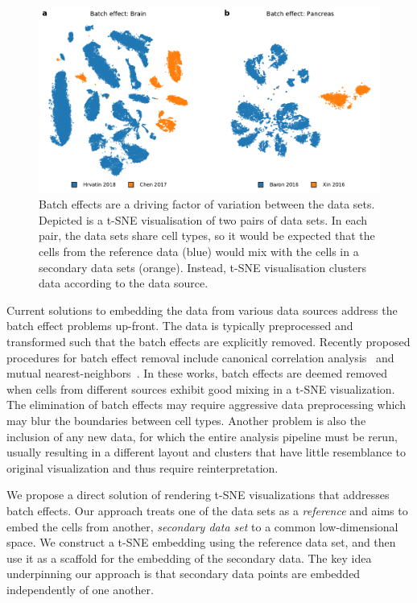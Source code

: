 \documentclass[runningheads]{llncs}
\begin{document}
\begin{figure}[htbp]
  \includegraphics[width=\textwidth]{figures/batch_effect.pdf}
  \caption{Batch effects are a driving factor of variation between the data
  sets.  Depicted is a t-SNE visualisation of two pairs of data sets. In each
  pair, the data sets share cell types, so it would be expected that the cells
  from the reference data (blue) would mix with the cells in a secondary data
  sets (orange).  Instead, t-SNE visualisation clusters data according to the
  data source.}
  \label{fig:batch_effect}
\end{figure}

Current solutions to embedding the data from various data sources address the
batch effect problems up-front. The data is typically preprocessed and
transformed such that the batch effects are explicitly removed. Recently
proposed procedures for batch effect removal include canonical correlation
analysis~\cite{cca} and mutual nearest-neighbors~\cite{mnn,seurat}.  In these
works, batch effects are deemed removed when cells from different sources
exhibit good mixing in a t-SNE visualization.  The elimination of batch effects
may require aggressive data preprocessing which may blur the boundaries between
cell types. Another problem is also the inclusion of any new data, for which
the entire analysis pipeline must be rerun, usually resulting in a different
layout and clusters that have little resemblance to original visualization and
thus require reinterpretation.

We propose a direct solution of rendering t-SNE visualizations that addresses
batch effects. Our approach treats one of the data sets as a {\em reference}
and aims to embed the cells from another, {\em secondary data set} to a common
low-dimensional space.  We construct a t\nobreakdash -SNE embedding using the
reference data set, and then use it as a scaffold for the embedding of the
secondary data.  The key idea underpinning our approach is that secondary data
points are embedded independently of one another.
\end{document}
